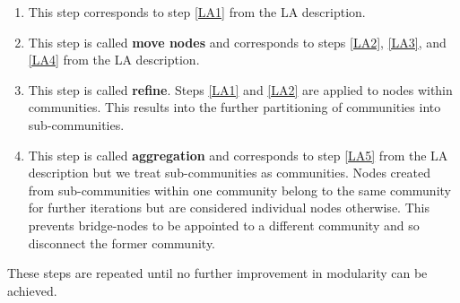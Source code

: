 \begin{enumerate}[label=\alph*)]
  \label{leidenAlgorithmPrinciple}
  \item This step corresponds to step \ref{LA1} from the LA description. 
    \label{LeAa}
  \item This step is called \textbf{move nodes} and corresponds to steps \ref{LA2}, \ref{LA3}, and \ref{LA4} from the LA description. 
    \label{LeAb}
  \item This step is called \textbf{refine}. Steps \ref{LA1} and \ref{LA2} are applied to nodes within communities. This results into the further partitioning of communities into sub-communities.
    \label{LeAc}
  \item This step is called \textbf{aggregation} and corresponds to step \ref{LA5} from the LA description but we treat sub-communities as communities. Nodes created from sub-communities within one community belong to the same community for further iterations but are considered individual nodes otherwise. This prevents bridge-nodes to be appointed to a different community and so disconnect the former community.
    \label{LeAd}
\end{enumerate}
These steps are repeated until no further improvement in modularity can be achieved.